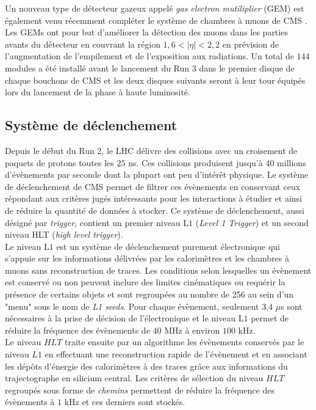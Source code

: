 Un nouveau type de détecteur gazeux appelé \textit{gas electron mutiliplier} (GEM) est également venu récemment compléter le système de chambres à muons de CMS \cite{GEM1,GEM2}. Les GEMs ont pour but d'améliorer la détection des muons dans les parties avants du détecteur en couvrant la région $1,6<|\eta|<2,2$ en prévision de l'augmentation de l'empilement et de l'exposition aux radiations. Un total de $144$ modules a été installé avant le lancement du Run 3 dans le premier disque de chaque bouchons de CMS et les deux disques suivants seront à leur tour équipés lors du lancement de la phase à haute luminosité. 

\subsection{Système de déclenchement}

Depuis le début du Run 2, le LHC délivre des collisions avec un croisement de paquets de protons toutes les $25$ ns. Ces collisions produisent jusqu'à $40$ millions d'évènements par seconde dont la plupart ont peu d'intérêt physique. Le système de déclenchement de CMS \cite{triggersystem} permet de filtrer ces évènements en conservant ceux répondant aux critères jugés intéressants pour les interactions à étudier et ainsi de réduire la quantité de données à stocker. Ce système de déclenchement, aussi désigné par \textit{trigger}, contient un premier niveau L$1$ (\textit{Level 1 Trigger}) et un second niveau HLT (\textit{high level trigger}). \\

Le niveau L$1$ est un système de déclenchement purement électronique qui s'appuie sur les informations délivrées par les calorimètres et les chambres à muons sans reconstruction de traces. Les conditions selon lesquelles un évènement est conservé ou non peuvent inclure des limites cinématiques ou requérir la présence de certains objets et sont regroupées au nombre de 256 au sein d'un "menu" sous le nom de \textit{L1 seeds}. Pour chaque évènement, seulement 3,4 $\mu$s sont nécessaires à la prise de décision de l'électronique et le niveau L$1$ permet de réduire la fréquence des évènements de $40$ MHz à environ $100$ kHz. \\

Le niveau $HLT$ traite ensuite par un algorithme les évènements conservés par le niveau $L1$ en effectuant une reconstruction rapide de l'évènement et en associant les dépôts d'énergie des calorimètres à des traces grâce aux informations du trajectographe en silicium central. Les critères de sélection du niveau $HLT$ regroupés sous forme de \textit{chemins} permettent de réduire la fréquence des évènements à $1$ kHz et ces derniers sont stockés. \\